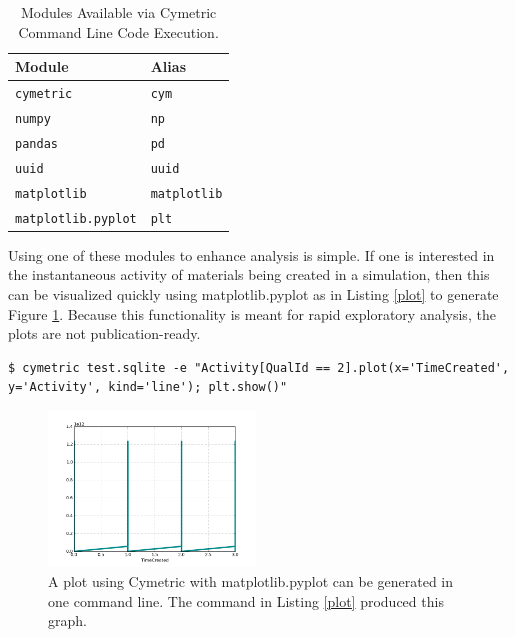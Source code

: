 \documentclass{anstrans}
\newcommand{\code}[1]{{\color{code}\texttt{#1}}}
\begin{document}
\begin{table}[htb]
\centering
\caption{Modules Available via Cymetric Command Line Code Execution.}
\begin{tabular}{ll}
\toprule
  Module                   & Alias \\
\midrule
  \code{cymetric}          & \code {cym} \\
  \code{numpy}             & \code{np} \\  
  \code{pandas}            & \code{pd} \\
  \code{uuid}              & \code{uuid} \\
  \code{matplotlib}        & \code{matplotlib} \\
  \code{matplotlib.pyplot} & \code{plt} \\
\bottomrule
\end{tabular}
  \label{tab:modules}
\end{table}

Using one of these modules to enhance analysis is simple. 
If one is interested in the instantaneous activity of materials being created in a simulation, 
then this can be visualized quickly using matplotlib.pyplot as in Listing \ref{plot} to generate Figure \ref{fig:actplot}.
Because this functionality is meant for rapid exploratory analysis, the plots are not publication-ready. 

\begin{lstlisting}[caption ={Creating a Plot}, label=plot]
$ cymetric test.sqlite -e "Activity[QualId == 2].plot(x='TimeCreated', y='Activity', kind='line'); plt.show()"
\end{lstlisting}

\begin{figure}[htbp!]
\begin{centering}
\includegraphics[width=0.49\textwidth]{act.png}
\end{centering}
\caption{A plot using Cymetric with matplotlib.pyplot can be generated in one command line. The command in Listing \ref{plot} produced this graph.}
\label{fig:actplot}
\end{figure}
\end{document}
